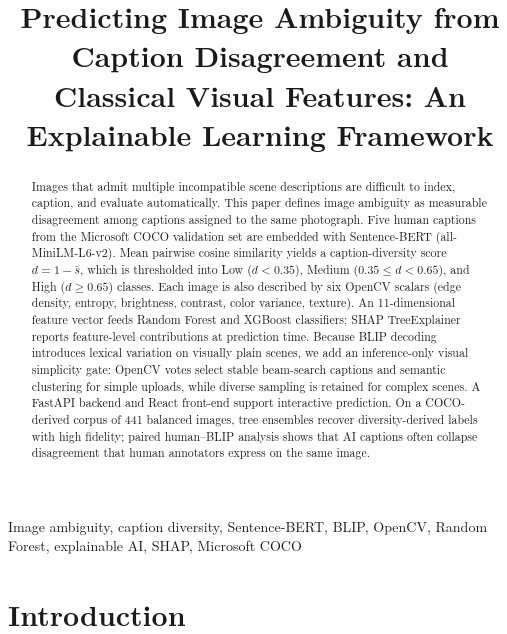 \documentclass[conference]{IEEEtran}
\begin{document}
\title{Predicting Image Ambiguity from Caption Disagreement and Classical Visual Features: An Explainable Learning Framework}

\author{
}

\maketitle

\begin{abstract}
Images that admit multiple incompatible scene descriptions are difficult to index, caption, and evaluate automatically. This paper defines image ambiguity as measurable disagreement among captions assigned to the same photograph. Five human captions from the Microsoft COCO validation set are embedded with Sentence-BERT (all-MiniLM-L6-v2). Mean pairwise cosine similarity yields a caption-diversity score $d=1-\bar{s}$, which is thresholded into Low ($d<0.35$), Medium ($0.35\!\le\! d<0.65$), and High ($d\!\ge\!0.65$) classes. Each image is also described by six OpenCV scalars (edge density, entropy, brightness, contrast, color variance, texture). An 11-dimensional feature vector feeds Random Forest and XGBoost classifiers; SHAP TreeExplainer reports feature-level contributions at prediction time. Because BLIP decoding introduces lexical variation on visually plain scenes, we add an inference-only visual simplicity gate: OpenCV votes select stable beam-search captions and semantic clustering for simple uploads, while diverse sampling is retained for complex scenes. A FastAPI backend and React front-end support interactive prediction. On a COCO-derived corpus of 441 balanced images, tree ensembles recover diversity-derived labels with high fidelity; paired human--BLIP analysis shows that AI captions often collapse disagreement that human annotators express on the same image.
\end{abstract}

\begin{IEEEkeywords}
Image ambiguity, caption diversity, Sentence-BERT, BLIP, OpenCV, Random Forest, explainable AI, SHAP, Microsoft COCO
\end{IEEEkeywords}

\section{Introduction}
\label{sec:intro}
\end{document}
